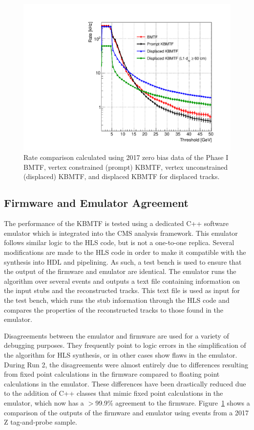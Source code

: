 \begin{figure}[htbp!]
	\centering
	\includegraphics[width=0.5\linewidth]{figs/04_muons/rate_kmtf.pdf}
	\caption[Rate comparison calculated using 2017 zero bias data of the Phase I BMTF, vertex constrained (prompt) KBMTF, vertex unconstrained (displaced) KBMTF, and displaced KBMTF for displaced tracks.]{Rate comparison calculated using 2017 zero bias data of the Phase I BMTF, vertex constrained (prompt) KBMTF, vertex unconstrained (displaced) KBMTF, and displaced KBMTF for displaced tracks.}
	\label{fig:kmtf_rate}
\end{figure}

\subsection{Firmware and Emulator Agreement} \label{sec:kmtf_fwVsEmu}
The performance of the KBMTF is tested using a dedicated C++ software emulator which is integrated into the CMS analysis framework. This emulator follows similar logic to the HLS code, but is not a one-to-one replica. Several modifications are made to the HLS code in order to make it compatible with the synthesis into HDL and pipelining. As such, a test bench is used to ensure that the output of the firmware and emulator are identical. The emulator runs the algorithm over several events and outputs a text file containing information on the input stubs and the reconstructed tracks. This text file is used as input for the test bench, which runs the stub information through the HLS code and compares the properties of the reconstructed tracks to those found in the emulator.

Disagreements between the emulator and firmware are used for a variety of debugging purposes. They frequently point to logic errors in the simplification of the algorithm for HLS synthesis, or in other cases show flaws in the emulator. During Run 2, the disagreements were almost entirely due to differences resulting from fixed point calculations in the firmware compared to floating point calculations in the emulator. These differences have been drastically reduced due to the addition of C++ classes that mimic fixed point calculations in the emulator, which now has a $>$99.9\% agreement to the firmware. Figure~\ref{fig:kmtf_rate} shows a comparison of the outputs of the firmware and emulator using events from a 2017 Z tag-and-probe sample.


